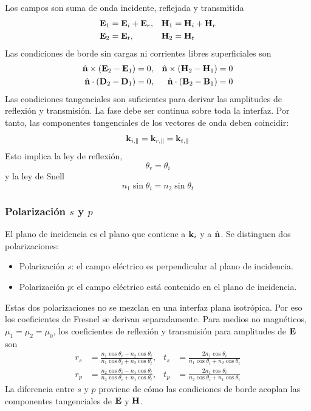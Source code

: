 \documentclass[]{article}
\numberwithin{equation}{section}
\begin{document}
Los campos son suma de onda incidente, reflejada y transmitida
\begin{align*}
	\mathbf{E}_1 &= \mathbf{E}_i + \mathbf{E}_r, & \mathbf{H}_1 &= \mathbf{H}_i + \mathbf{H}_r\\
	\mathbf{E}_2 &= \mathbf{E}_t, & \mathbf{H}_2 &= \mathbf{H}_t
\end{align*}
Las condiciones de borde sin cargas ni corrientes libres superficiales son
\begin{align*}
	\hat{\mathbf{n}} \times(\mathbf{E}_2 - \mathbf{E}_1) &= 0, & \hat{\mathbf{n}} \times(\mathbf{H}_2 - \mathbf{H}_1) &= 0\\
	\hat{\mathbf{n}} \cdot (\mathbf{D}_2 - \mathbf{D}_1) &= 0, & \hat{\mathbf{n}} \cdot (\mathbf{B}_2 - \mathbf{B}_1) &= 0
\end{align*}
Las condiciones tangenciales son suficientes para derivar las amplitudes de reflexión y transmisión. La fase debe ser continua sobre toda la interfaz. Por tanto, las componentes tangenciales de los vectores de onda deben coincidir:
\begin{equation}
	\mathbf{k}_{i,\parallel} = \mathbf{k}_{r,\parallel} = \mathbf{k}_{t,\parallel}
\end{equation}
Esto implica la ley de reflexión,
\begin{equation}
	\theta_{r} = \theta_{i}
\end{equation}
y la ley de Snell
\begin{equation}
	n_1 \sin\theta_{i} = n_2 \sin\theta_{t}
\end{equation}

\subsubsection{Polarización $s$ y $p$}
El plano de incidencia es el plano que contiene a $\mathbf{k}_i$ y a $\hat{\mathbf{n}}$. Se distinguen dos polarizaciones:
\begin{itemize}
	\item Polarización $s$: el campo eléctrico es perpendicular al plano de incidencia.
	\item Polarización $p$: el campo eléctrico está contenido en el plano de incidencia.
\end{itemize}
Estas dos polarizaciones no se mezclan en una interfaz plana isotrópica. Por eso los coeficientes de Fresnel se derivan separadamente. Para medios no magnéticos, $\mu_1 = \mu_2 = \mu_0$, los coeficientes de reflexión y transmisión para amplitudes de $\mathbf{E}$ son
\begin{align}
	r_s &= \frac{n_1\cos\theta_{i} - n_2\cos\theta_{t}}{n_1\cos\theta_{i} + n_2\cos\theta_{t}}, & t_s &= \frac{2 n_1 \cos\theta_{i}}{n_1\cos\theta_{i} + n_2\cos\theta_{t}}\\
	r_p &= \frac{n_2\cos\theta_{i} - n_1\cos\theta_{t}}{n_2\cos\theta_{i} + n_1\cos\theta_{t}}, & t_p &= \frac{2 n_1 \cos\theta_{i}}{n_2\cos\theta_{i} + n_1\cos\theta_{t}}
\end{align}
La diferencia entre $s$ y $p$ proviene de cómo las condiciones de borde acoplan las componentes tangenciales de $\mathbf{E}$ y $\mathbf{H}$.
\end{document}
